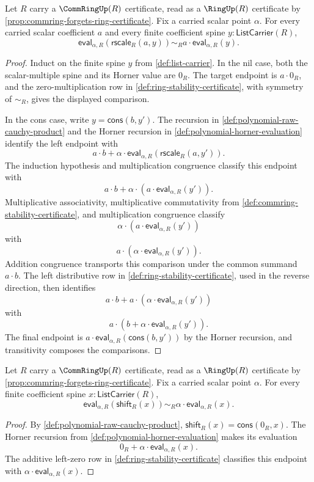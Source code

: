 \begin{lemma}
\label{lem:horner-evaluation-raw-scalar-product}
Let $R$ carry a $\CommRingUp(R)$ certificate, read as a $\RingUp(R)$ certificate by \autoref{prop:commring-forgets-ring-certificate}. Fix a carried scalar point $\alpha$. For every carried scalar coefficient $a$ and every finite coefficient spine $y:\mathsf{ListCarrier}(R)$,
$$
\mathsf{eval}_{\alpha,R}(\mathsf{rscale}_R(a,y))\sim_R
 a\cdot\mathsf{eval}_{\alpha,R}(y).
$$
\end{lemma}
\begin{proof}
Induct on the finite spine $y$ from \autoref{def:list-carrier}. In the nil case, both the scalar-multiple spine and its Horner value are $0_R$. The target endpoint is $a\cdot0_R$, and the zero-multiplication row in \autoref{def:ring-stability-certificate}, with symmetry of $\sim_R$, gives the displayed comparison.

In the cons case, write $y=\mathsf{cons}(b,y')$. The recursion in \autoref{def:polynomial-raw-cauchy-product} and the Horner recursion in \autoref{def:polynomial-horner-evaluation} identify the left endpoint with
$$
a\cdot b+\alpha\cdot\mathsf{eval}_{\alpha,R}(\mathsf{rscale}_R(a,y')).
$$
The induction hypothesis and multiplication congruence classify this endpoint with
$$
a\cdot b+\alpha\cdot(a\cdot\mathsf{eval}_{\alpha,R}(y')).
$$
Multiplicative associativity, multiplicative commutativity from \autoref{def:commring-stability-certificate}, and multiplication congruence classify
$$
\alpha\cdot(a\cdot\mathsf{eval}_{\alpha,R}(y'))
$$
with
$$
a\cdot(\alpha\cdot\mathsf{eval}_{\alpha,R}(y')).
$$
Addition congruence transports this comparison under the common summand $a\cdot b$. The left distributive row in \autoref{def:ring-stability-certificate}, used in the reverse direction, then identifies
$$
a\cdot b+a\cdot(\alpha\cdot\mathsf{eval}_{\alpha,R}(y'))
$$
with
$$
a\cdot(b+\alpha\cdot\mathsf{eval}_{\alpha,R}(y')).
$$
The final endpoint is $a\cdot\mathsf{eval}_{\alpha,R}(\mathsf{cons}(b,y'))$ by the Horner recursion, and transitivity composes the comparisons.
\end{proof}

\begin{lemma}
\label{lem:horner-evaluation-coefficient-shift}
Let $R$ carry a $\CommRingUp(R)$ certificate, read as a $\RingUp(R)$ certificate by \autoref{prop:commring-forgets-ring-certificate}. Fix a carried scalar point $\alpha$. For every finite coefficient spine $x:\mathsf{ListCarrier}(R)$,
$$
\mathsf{eval}_{\alpha,R}(\mathsf{shift}_R(x))\sim_R
\alpha\cdot\mathsf{eval}_{\alpha,R}(x).
$$
\end{lemma}
\begin{proof}
By \autoref{def:polynomial-raw-cauchy-product}, $\mathsf{shift}_R(x)=\mathsf{cons}(0_R,x)$. The Horner recursion from \autoref{def:polynomial-horner-evaluation} makes its evaluation
$$
0_R+\alpha\cdot\mathsf{eval}_{\alpha,R}(x).
$$
The additive left-zero row in \autoref{def:ring-stability-certificate} classifies this endpoint with $\alpha\cdot\mathsf{eval}_{\alpha,R}(x)$.
\end{proof}

